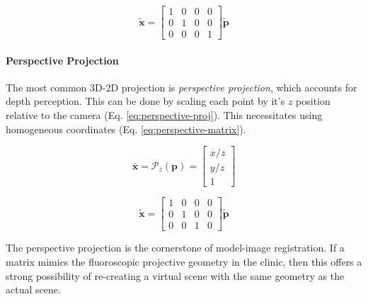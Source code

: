 \begin{equation}
    \tilde{\mathbf{x}} = \begin{bmatrix}
        1 & 0 & 0 & 0 \\ 0 & 1 & 0 & 0 \\ 0 & 0 & 0 & 1
    \end{bmatrix}\tilde{\mathbf{p}}
    \label{eq:orthographic-proj}
\end{equation}

\paragraph*{Perspective Projection} 
The most common 3D-2D projection is \emph{perspective projection}, which accounts for depth perception. This can be done by scaling each point by it's $z$ position relative to the camera (Eq. \ref{eq:perspective-proj}). This necessitates using homogeneous coordinates (Eq. \ref{eq:perspective-matrix}).

\begin{equation}
    \bar{\mathbf{x}} = \mathcal{P}_z(\mathbf{p}) = \begin{bmatrix}
        x/z \\ y/z \\ 1
    \end{bmatrix}
    \label{eq:perspective-proj}
\end{equation}

\begin{equation}
    \tilde{\mathbf{x}} = \begin{bmatrix}
        1 & 0 & 0 & 0 \\ 0 & 1 & 0 & 0 \\ 0 & 0 & 1 & 0 
    \end{bmatrix}\tilde{\mathbf{p}}
    \label{eq:perspective-matrix}
\end{equation}

The perspective projection is the cornerstone of model-image registration. If a matrix mimics the fluoroscopic projective geometry in the clinic, then this offers a strong possibility of re-creating a virtual scene with the same geometry as the actual scene.

